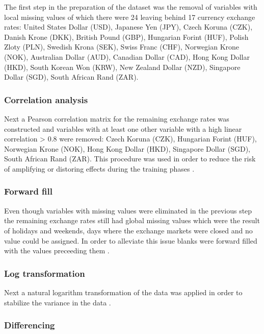 The first step in the preparation of the dataset was the removal of variables with local missing values of which there were 24 leaving behind 17 currency exchange rates: United States Dollar (USD), Japanese Yen (JPY), Czech Koruna (CZK), Danish Krone (DKK), British Pound (GBP), Hungarian Forint (HUF), Polish Zloty (PLN), Swedish Krona (SEK), Swiss Franc (CHF), Norwegian Krone (NOK), Australian Dollar (AUD), Canadian Dollar (CAD), Hong Kong Dollar (HKD), South Korean Won (KRW), New Zealand Dollar (NZD), Singapore Dollar (SGD), South African Rand (ZAR).

\subsubsection{Correlation analysis}\label{Correlation analysis}

Next a Pearson correlation matrix for the remaining exchange rates was constructed and variables with at least one other variable with a high linear correlation > 0.8 were removed: Czech Koruna (CZK), Hungarian Forint (HUF), Norwegian Krone (NOK), Hong Kong Dollar (HKD), Singapore Dollar (SGD), South African Rand (ZAR). This procedure was used in order to reduce the risk of amplifying or distoring effects during the training phases \cite{genetic}.

\subsubsection{Forward fill}\label{Forward fill}

Even though variables with missing values were eliminated in the previous step the remaining exchange rates still had global missing values which were the result of holidays and weekends, days where the exchange markets were closed and no value could be assigned. In order to alleviate this issue blanks were forward filled with the values preceeding them \cite{techniques,rf-svr}.

\subsubsection{Log transformation}\label{Log transformation}

Next a natural logarithm transformation of the data was applied in order to stabilize the variance in the data \cite{nn-vs-chaotic,robust-regression,gbp-usd-forecasting}.

\subsubsection{Differencing}\label{Differencing}

